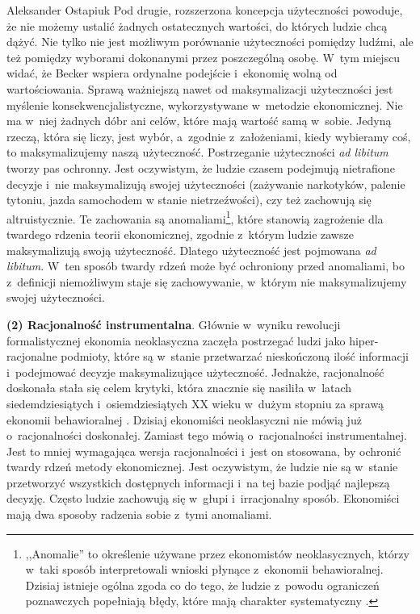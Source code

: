 \begin{artplenv}{Aleksander Ostapiuk}
Pod drugie, rozszerzona koncepcja użyteczności powoduje, że nie możemy ustalić żadnych ostatecznych wartości, do których
ludzie chcą dążyć. Nie tylko nie jest możliwym porównanie użyteczności pomiędzy ludźmi,
ale też pomiędzy wyborami dokonanymi przez poszczególną osobę. W~tym miejscu widać, że Becker
wspiera ordynalne podejście i~ekonomię wolną od wartościowania. Sprawą ważniejszą nawet od maksymalizacji użyteczności
jest myślenie konsekwencjalistyczne, wykorzystywane w~metodzie ekonomicznej. Nie ma w~niej żadnych dóbr ani celów, które
mają wartość samą w~sobie. Jedyną rzeczą, która się liczy, jest wybór, a~zgodnie z~założeniami, kiedy wybieramy coś, to
maksymalizujemy naszą użyteczność. Postrzeganie użyteczności \textit{ad libitum }tworzy pas ochronny. Jest
oczywistym, że ludzie czasem podejmują nietrafione decyzje i~nie maksymalizują swojej użyteczności (zażywanie
narkotyków, palenie tytoniu, jazda samochodem w stanie nietrzeźwości), czy też zachowują się altruistycznie. Te zachowania są
anomaliami\footnote{,,Anomalie'' to określenie używane przez ekonomistów neoklasycznych, którzy w~taki sposób interpretowali
wnioski płynące z~ekonomii behawioralnej. Dzisiaj istnieje ogólna zgoda co do tego, że ludzie z~powodu ograniczeń
poznawczych popełniają błędy, które mają charakter systematyczny
\parencite{thaler_misbehaving:_2015}.
}, które stanowią
zagrożenie dla twardego rdzenia teorii ekonomicznej, zgodnie z~którym ludzie zawsze maksymalizują swoją użyteczność. Dlatego użyteczność jest
pojmowana \textit{ad libitum}. W~ten sposób twardy rdzeń może być ochroniony przed anomaliami, bo z~definicji
niemożliwym staje się zachowywanie, w~którym nie maksymalizujemy swojej użyteczności. 

\textbf{(2) Racjonalność instrumentalna}. Głównie w~wyniku rewolucji formalistycznej ekonomia
neoklasyczna zaczęła postrzegać ludzi jako hiper-racjonalne podmioty, które są w~stanie przetwarzać nieskończoną
ilość informacji i~podejmować decyzje maksymalizujące użyteczność. Jednakże, racjonalność doskonała
stała się celem krytyki, która znacznie się nasiliła w~latach siedemdziesiątych i~osiemdziesiątych XX wieku w~dużym
stopniu za sprawą ekonomii behawioralnej
\parencite{thaler_misbehaving:_2015}.
Dzisiaj ekonomiści neoklasyczni nie
mówią już o~racjonalności doskonałej. Zamiast tego mówią o~racjonalności instrumentalnej. Jest to mniej wymagająca
wersja racjonalności i~jest on stosowana, by ochronić twardy rdzeń metody ekonomicznej. Jest oczywistym, że ludzie nie
są w~stanie przetworzyć wszystkich dostępnych informacji i~na tej bazie podjąć najlepszą decyzję. Często ludzie
zachowują się w~głupi i~irracjonalny sposób. Ekonomiści mają dwa sposoby radzenia sobie z~tymi anomaliami.


\end{artplenv}
